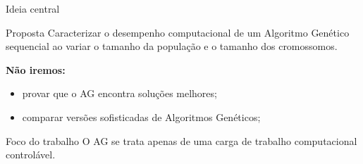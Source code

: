 \documentclass[aspectratio=169,11pt]{beamer}
\begin{document}
\begin{frame}{Ideia central}

    \vspace{0.15cm}

    \begin{questionbox}{Proposta}
        Caracterizar o desempenho computacional de um
        Algoritmo Genético sequencial ao variar o tamanho da
        população e o tamanho dos cromossomos.
    \end{questionbox}

    \vspace{0.28cm}

    \textbf{Não iremos:}

    \begin{itemize}
        \item provar que o AG encontra soluções melhores;
        \item comparar versões sofisticadas de Algoritmos Genéticos;
    \end{itemize}

    \vspace{0.10cm}

    \begin{impactbox}{Foco do trabalho}
        O AG se trata apenas de uma carga de trabalho computacional controlável.
    \end{impactbox}

\end{frame}

\end{document}
